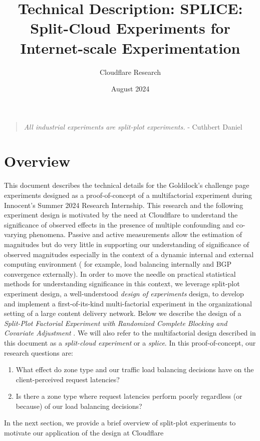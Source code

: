 \documentclass{article}
\title{Technical Description: SPLICE: Split-Cloud Experiments for Internet-scale Experimentation }
\author{Cloudflare Research}
\date{August 2024}
\begin{document}
\maketitle

\begin{quote}
\textit{\quad All industrial experiments are split-plot experiments.} - Cuthbert Daniel
\end{quote}

\section{Overview}
This document describes the technical details for the Goldilock's challenge page experiments designed as a proof-of-concept of a multifactorial experiment during Innocent's Summer 2024 Research Internship. 
This research and the following experiment design is motivated by the need at Cloudflare to understand the significance of observed effects in the presence of multiple confounding and co-varying phenomena. Passive and active measurements allow the estimation of magnitudes but do very little in supporting our understanding of significance of observed magnitudes especially in the context of a dynamic internal and external computing environment ( for example, load balancing internally and BGP convergence externally). In order to move the needle on practical statistical methods for understanding significance in this context, we leverage split-plot experiment design, a well-understood \textit{design of experiments} design, to develop and implement a first-of-its-kind multi-factorial experiment in the organizational setting of a large content delivery network. Below we describe the design of a \textit{Split-Plot Factorial Experiment with Randomized Complete Blocking and Covariate Adjustment} \cite{Montgomery2020-qa}. We will also refer to the multifactorial design described in this document as a \textit{split-cloud experiment} or a \textit{splice}. In this proof-of-concept, our research questions are:
\begin{enumerate}
    \item What effect do zone type and our traffic load balancing decisions have on the client-perceived request latencies?
    \item Is there a zone type where request latencies perform poorly regardless (or because) of our load balancing decisions?
\end{enumerate}

In the next section, we provide a brief overview of split-plot experiments to motivate our application of the design at Cloudflare
\end{document}
